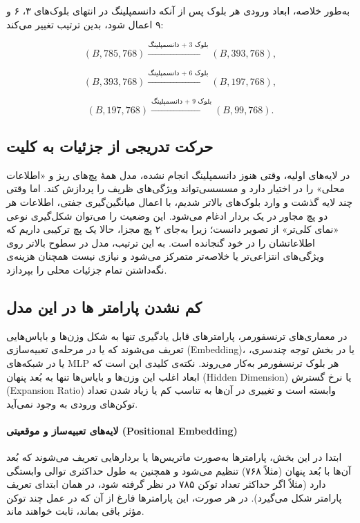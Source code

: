 به‌طور خلاصه، ابعاد ورودی هر بلوک پس از آنکه دانسمپلینگ در انتهای بلوک‌های ۳، ۶ و ۹ اعمال شود، بدین ترتیب تغییر می‌کند:

\[
(B, 785, 768) 
\xrightarrow{\text{بلوک 3 + دانسمپلینگ}} 
(B, 393, 768),
\]

\[
(B, 393, 768) 
\xrightarrow{\text{بلوک 6 + دانسمپلینگ}} 
(B, 197, 768),
\]

\[
(B, 197, 768) 
\xrightarrow{\text{بلوک 9 + دانسمپلینگ}} 
(B, 99, 768).
\]



\subsection{حرکت تدریجی از جزئیات به کلیت}

در لایه‌های اولیه، وقتی هنوز دانسمپلینگ انجام نشده، مدل همۀ پچ‌های ریز و «اطلاعات محلی» را در اختیار دارد و مسسسی‌تواند ویژگی‌های ظریف را پردازش کند. اما وقتی چند لایه گذشت و وارد بلوک‌های بالاتر شدیم، با اعمال میانگین‌گیری جفتی، اطلاعات هر دو پچ مجاور در یک بردار ادغام می‌شود. این وضعیت را می‌توان شکل‌گیری نوعی «نمای کلی‌تر» از تصویر دانست؛ زیرا به‌جای ۲ پچ مجزا، حالا یک پچ ترکیبی داریم که اطلاعاتشان را در خود گنجانده است. به این ترتیب، مدل در سطوح بالاتر روی ویژگی‌های انتزاعی‌تر یا خلاصه‌تر متمرکز می‌شود و نیازی نیست همچنان هزینه‌ی نگه‌داشتن تمام جزئیات محلی را بپردازد.

\subsection{کم نشدن پارامتر ها در این مدل}


در معماری‌های ترنسفورمر، پارامترهای قابل یادگیری تنها به شکل وزن‌ها و بایاس‌هایی تعریف می‌شوند که یا در مرحله‌ی تعبیه‌سازی (Embedding)، یا در بخش توجه چندسری، یا در شبکه‌های MLP هر بلوک ترنسفورمر به‌کار می‌روند. نکته‌ی کلیدی این است که ابعاد اغلب این وزن‌ها و بایاس‌ها تنها به بُعد پنهان (Hidden Dimension) یا نرخ گسترش (Expansion Ratio) وابسته است و تغییری در آن‌ها به تناسب کم یا زیاد شدن تعداد توکن‌های ورودی به وجود نمی‌آید.

\paragraph{لایه‌های تعبیه‌ساز و موقعیتی (Positional Embedding)}
ابتدا در این بخش، پارامترها به‌صورت ماتریس‌ها یا بردارهایی تعریف می‌شوند که بُعد آن‌ها با بُعد پنهان (مثلاً ۷۶۸) تنظیم می‌شود و همچنین به طول حداکثری توالی وابستگی دارد (مثلاً اگر حداکثر تعداد توکن ۷۸۵ در نظر گرفته شود، در همان ابتدای تعریف پارامتر شکل می‌گیرد). در هر صورت، این پارامترها فارغ از آن که در عمل چند توکن مؤثر باقی بماند، ثابت خواهند ماند.

